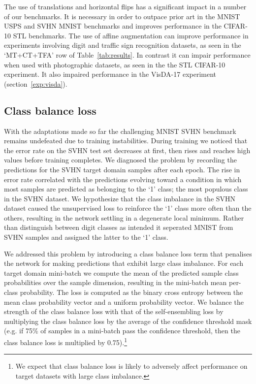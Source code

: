 \documentclass{article}
\begin{document}
The use of translations and horizontal flips has a significant impact in a number of our benchmarks. It is necessary in order to outpace prior art in the MNIST  USPS and SVHN  MNIST benchmarks and improves performance in the CIFAR-10  STL benchmarks. The use of affine augmentation can improve performance in experiments involving digit and traffic sign recognition datasets, as seen in the `MT+CT+TFA' row of Table~\ref{tab:results}. In contrast it can impair performance when used with photographic datasets, as seen in the the STL  CIFAR-10 experiment. It also impaired performance in the VisDA-17 experiment (section~\ref{exp:visda}).


\subsection{Class balance loss}
\label{sec:method:clsbal}

With the adaptations made so far the challenging MNIST  SVHN benchmark remains undefeated due to training instabilities. During training we noticed that the error rate on the SVHN test set decreases at first, then rises and reaches high values before training completes. We diagnosed the problem by recording the predictions for the SVHN target domain samples after each epoch. The rise in error rate correlated with the predictions evolving toward a condition in which most samples are predicted as belonging to the `1' class; the most populous class in the SVHN dataset. We hypothesize that the class imbalance in the SVHN dataset caused the unsupervised loss to reinforce the `1' class more often than the others, resulting in the network settling in a degenerate local minimum. Rather than distinguish between digit classes as intended it seperated MNIST from SVHN samples and assigned the latter to the `1' class.

We addressed this problem by introducing a class balance loss term that penalises the network for making predictions that exhibit large class imbalance. For each target domain mini-batch we compute the mean of the predicted sample class probabilities over the sample dimension, resulting in the mini-batch mean per-class probability. The loss is computed as the binary cross entropy between the mean class probability vector and a uniform probability vector. We balance the strength of the class balance loss with that of the self-ensembling loss by multiplying the class balance loss by the average of the confidence threshold mask (e.g. if 75\% of samples in a mini-batch pass the confidence threshold, then the class balance loss is multiplied by 0.75).\footnote{We expect that class balance loss is likely to adversely affect performance on target datasets with large class imbalance.}
\end{document}
